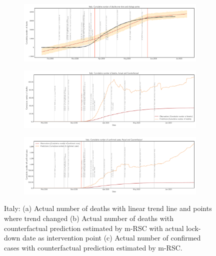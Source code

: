 \documentclass[final,authoryear,5p,times,twocolumn]{elsarticle}
\begin{document}
		\begin{figure}
		\centering
		\begin{subfigure}[b]{\textwidth}
			\centering
			\includegraphics[width=0.9\linewidth,height=0.2\textheight]{FIG13}
		\end{subfigure}
		
		\begin{subfigure}[b]{\textwidth}
			\centering
			\includegraphics[width=0.9\linewidth,height=0.2\textheight]{FIG14}
		\end{subfigure}
		
		\begin{subfigure}[b]{\textwidth}
			\centering
			\includegraphics[width=0.9\linewidth,height=0.2\textheight]{FIG15}
		\end{subfigure}
		
		\caption[Italy]{Italy: (a) Actual number of deaths with linear trend line and points where trend changed (b) Actual number of deaths with counterfactual prediction estimated by m-RSC with actual lock-down date as intervention point (c) Actual number of confirmed cases with counterfactual prediction estimated by m-RSC.}
		\label{fig6} 
	\end{figure}
\end{document}
